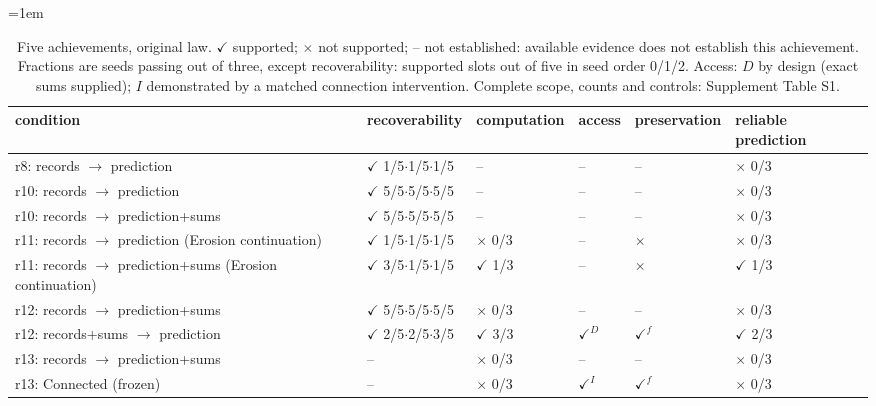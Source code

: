 \begin{table}[tb]
\centering
\caption{Five achievements, original law. $\checkmark$ supported; $\times$ not supported; – not established: available evidence does not establish this achievement. Fractions are seeds passing out of three, except recoverability: supported slots out of five in seed order 0/1/2. Access: $D$ by design (exact sums supplied); $I$ demonstrated by a matched connection intervention. Complete scope, counts and controls: Supplement Table S1.}\label{tab:table1}
\begingroup\fontsize{8}{9.5}\selectfont\setlength{\tabcolsep}{3pt}\emergencystretch=1em
\begin{tabular}{@{}>{\raggedright\arraybackslash}p{2.500in}>{\raggedright\arraybackslash}p{0.910in}>{\raggedright\arraybackslash}p{0.780in}>{\raggedright\arraybackslash}p{0.430in}>{\raggedright\arraybackslash}p{0.720in}>{\raggedright\arraybackslash}p{0.740in}@{}}
\toprule
\textbf{condition} & \textbf{recoverability} & \textbf{computation} & \textbf{access} & \textbf{preservation} & \textbf{reliable prediction} \\
\midrule
r8: records $\to$ prediction & $\checkmark$ 1/5$\cdot$1/5$\cdot$1/5 & – & – & – & $\times$ 0/3 \\
r10: records $\to$ prediction & $\checkmark$ 5/5$\cdot$5/5$\cdot$5/5 & – & – & – & $\times$ 0/3 \\
r10: records $\to$ prediction+sums & $\checkmark$ 5/5$\cdot$5/5$\cdot$5/5 & – & – & – & $\times$ 0/3 \\
r11: records $\to$ prediction (Erosion continuation) & $\checkmark$ 1/5$\cdot$1/5$\cdot$1/5 & $\times$ 0/3 & – & $\times$ & $\times$ 0/3 \\
r11: records $\to$ prediction+sums (Erosion continuation) & $\checkmark$ 3/5$\cdot$1/5$\cdot$1/5 & $\checkmark$ 1/3 & – & $\times$ & $\checkmark$ 1/3 \\
r12: records $\to$ prediction+sums & $\checkmark$ 5/5$\cdot$5/5$\cdot$5/5 & $\times$ 0/3 & – & – & $\times$ 0/3 \\
r12: records+sums $\to$ prediction & $\checkmark$ 2/5$\cdot$2/5$\cdot$3/5 & $\checkmark$ 3/3 & $\checkmark^{D}$ & $\checkmark^{f}$ & $\checkmark$ 2/3 \\
r13: records $\to$ prediction+sums & – & $\times$ 0/3 & – & – & $\times$ 0/3 \\
r13: Connected (frozen) & – & $\times$ 0/3 & $\checkmark^{I}$ & $\checkmark^{f}$ & $\times$ 0/3 \\

\end{tabular}
\end{table}
